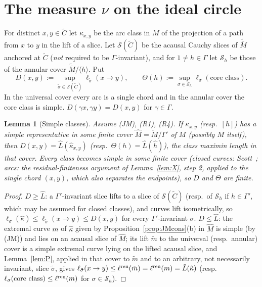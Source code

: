 \documentclass[aps,prd,onecolumn,superscriptaddress,nofootinbib,amsmath,amssymb,11pt]{revtex4-2}
\newtheorem{lemma}[theorem]{Lemma}
\theoremstyle{definition}
\newcommand{\Mbar}{\overline{M}}
\begin{document}
\section{The measure $\nu$ on the ideal circle}\label{sec:nu}

For distinct $x,y\in\tilde C$ let $\kappa_{x,y}$ be the arc class in $M$ of the projection of a path from $x$ to $y$ in the lift of
a slice. Let $\mathcal S(\tilde C)$ be the acausal Cauchy slices of $\tilde{\Mbar}$ anchored at $\tilde C$ (\emph{not} required
to be $\Gamma$-invariant), and for $1\ne h\in\Gamma$ let $\mathcal S_h$ be those of the annular cover $\tilde{\Mbar}/\langle h\rangle$.
Put
\[
D(x,y):=\sup_{\tilde\sigma\in\mathcal S(\tilde C)}\ell_{\tilde\sigma}(x\to y),\qquad\Theta(h):=\sup_{\sigma\in\mathcal S_h}\ell_\sigma(\text{core class}).
\]
In the universal cover every arc is a single chord and in the annular cover the core class is simple. $D(\gamma x,\gamma y)=D(x,y)$
for $\gamma\in\Gamma$.

\begin{lemma}[Simple classes]\label{lem:S}
Assume (JM), (R1), (R4). If $\kappa_{x,y}$ (resp.\ $[h]$) has a simple representative in some finite cover
$\widehat M=\tilde M/\Gamma'$ of $M$ (possibly $M$ itself), then $D(x,y)=\hat L(\hat\kappa_{x,y})$ (resp.\
$\Theta(h)=\hat L(\hat h)$), the class maximin length in that cover. Every class becomes simple in some finite cover
(closed curves: Scott~\cite{Scott1978}; arcs: the residual-finiteness argument of Lemma~\ref{lem:X}, step 2, applied to the
single chord $(x,y)$, which also separates the endpoints), so $D$ and $\Theta$ are finite.
\end{lemma}

\begin{proof}
$D\ge\hat L$: a $\Gamma'$-invariant slice lifts to a slice of $\mathcal S(\tilde C)$ (resp.\ of $\mathcal S_h$ if $h\in\Gamma'$, which
may be assumed for closed classes), and curves lift isometrically, so $\ell_\sigma(\hat\kappa)\le\ell_{\tilde\sigma}(x\to y)\le D(x,y)$
for every $\Gamma'$-invariant $\sigma$. $D\le\hat L$: the extremal curve $m$ of $\hat\kappa$ given by Proposition~\ref{prop:JMcons}(b) in
$\widehat M$ is simple (by (JM)) and lies on an acausal slice of $\widehat M$; its lift $\tilde m$ to the universal (resp.\ annular)
cover is a simple extremal curve lying on the lifted acausal slice, and Lemma~\ref{lem:P}, applied in that cover to $\tilde m$ and to
an arbitrary, not necessarily invariant, slice $\tilde\sigma$, gives $\ell_{\tilde\sigma}(x\to y)\le\ell^{\rm ren}(\tilde m)=\ell^{\rm
ren}(m)=\hat L(\hat\kappa)$ (resp.\ $\ell_\sigma(\text{core class})\le\ell^{\rm ren}(m)$ for $\sigma\in\mathcal S_h$).
\end{proof}
\end{document}
